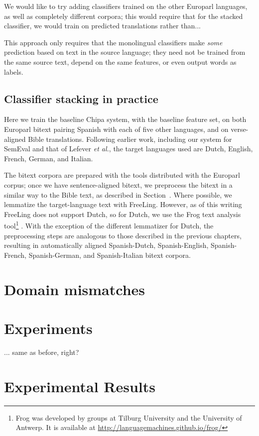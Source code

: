 We would like to try adding classifiers trained on the other Europarl
languages, as well as completely different corpora; this would require that for
the stacked classifier, we would train on predicted translations rather than...

This approach only requires that the monolingual classifiers make \emph{some}
prediction based on text in the source language; they need not be trained from
the same source text, depend on the same features, or even output words as
labels.

\subsection{Classifier stacking in practice}
Here we train the baseline Chipa system, with the baseline feature set, on both
Europarl bitext pairing Spanish with each of five other languages, and on
verse-aligned Bible translations. Following
earlier work, including our system for SemEval and that of Lefever \emph{et
al.}, the target languages used are Dutch, English, French, German, and
Italian.

The bitext corpora are prepared with the tools distributed with the Europarl
corpus; once we have sentence-aligned bitext, we preprocess the bitext in a
similar way to the Bible text, as described in
Section~\label{sec:datasetsandpreprocessing}. Where possible, we lemmatize the
target-language text with FreeLing. However, as of this writing FreeLing does
not support Dutch, so for Dutch, we use the Frog text analysis
tool\footnote{Frog was developed by groups at Tilburg
University and the University of Antwerp. It is available at
\url{http://languagemachines.github.io/frog/}} \cite{tadpole2007}. With the
exception of the different lemmatizer for Dutch, the preprocessing steps are
analogous to those described in the previous chapters, resulting in
automatically aligned Spanish-Dutch, Spanish-English, Spanish-French,
Spanish-German, and Spanish-Italian bitext corpora.

\section{Domain mismatches}

\section{Experiments}
\label{sec:multilingual-experiments}
... same as before, right?

\section{Experimental Results}
\label{sec:multilingual-results}

